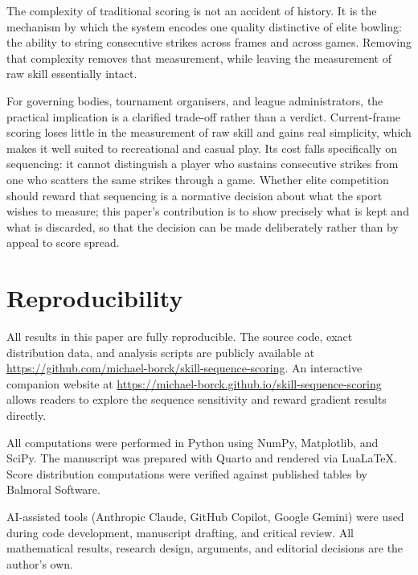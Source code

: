 \documentclass[USenglish]{article}
\theoremstyle{dgthm}
\theoremstyle{dgdef}
\begin{document}
The complexity of traditional scoring is not an accident of history. It is the mechanism by which the system encodes one quality distinctive of elite bowling: the ability to string consecutive strikes across frames and across games. Removing that complexity removes that measurement, while leaving the measurement of raw skill essentially intact.

For governing bodies, tournament organisers, and league administrators, the practical implication is a clarified trade-off rather than a verdict. Current-frame scoring loses little in the measurement of raw skill and gains real simplicity, which makes it well suited to recreational and casual play. Its cost falls specifically on sequencing: it cannot distinguish a player who sustains consecutive strikes from one who scatters the same strikes through a game. Whether elite competition should reward that sequencing is a normative decision about what the sport wishes to measure; this paper's contribution is to show precisely what is kept and what is discarded, so that the decision can be made deliberately rather than by appeal to score spread.


\section*{Reproducibility}

All results in this paper are fully reproducible. The source code, exact distribution data, and analysis scripts are publicly available at \url{https://github.com/michael-borck/skill-sequence-scoring}. An interactive companion website at \url{https://michael-borck.github.io/skill-sequence-scoring} allows readers to explore the sequence sensitivity and reward gradient results directly.


\begin{acknowledgement}
All computations were performed in Python using NumPy, Matplotlib, and SciPy. The manuscript was prepared with Quarto and rendered via LuaLaTeX. Score distribution computations were verified against published tables by Balmoral Software.

AI-assisted tools (Anthropic Claude, GitHub Copilot, Google Gemini) were used during code development, manuscript drafting, and critical review. All mathematical results, research design, arguments, and editorial decisions are the author's own.
\end{acknowledgement}



\end{document}
